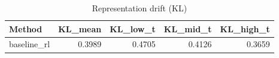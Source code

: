 \begin{table}[htbp]
\centering
\caption{Representation drift (KL)}
\label{tab:repr-drift}
\begin{tabular}{lrrrr}
\toprule
\textbf{Method} & \textbf{KL\_mean} & \textbf{KL\_low\_t} & \textbf{KL\_mid\_t} & \textbf{KL\_high\_t} \\
\midrule
baseline\_rl & 0.3989 & 0.4705 & 0.4126 & 0.3659 \\
\bottomrule
\end{tabular}
\end{table}